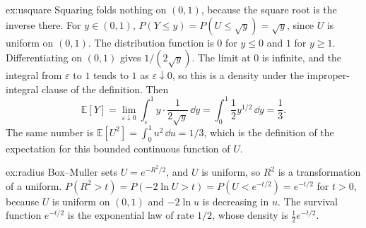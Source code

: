 \begin{solution}{ex:usquare}
\idea Squaring folds nothing on $(0,1)$, because the square root is the inverse there.
\writeup For $y\in(0,1)$, $P(Y\le y)=P(U\le\sqrt y)=\sqrt y$, since $U$ is uniform on $(0,1)$. The distribution function is $0$ for $y\le0$ and $1$ for $y\ge1$. Differentiating on $(0,1)$ gives $1/(2\sqrt y)$. The limit at $0$ is infinite, and the integral from $\varepsilon$ to $1$ tends to $1$ as $\varepsilon\downarrow0$, so this is a density under the improper-integral clause of the definition. Then
\[
 \mathbb E[Y]=\lim_{\varepsilon\downarrow0}\int_\varepsilon^1 y\cdot\frac{1}{2\sqrt y}\,\dd y=\int_0^1\frac12 y^{1/2}\,\dd y=\frac13.
\]
The same number is $\mathbb E[U^2]=\int_0^1 u^2\,\dd u=1/3$, which is the definition of the expectation for this bounded continuous function of $U$.
\end{solution}

\begin{solution}{ex:radius}
\idea Box--Muller sets $U=e^{-R^2/2}$, and $U$ is uniform, so $R^2$ is a transformation of a uniform.
\writeup $P(R^2>t)=P(-2\ln U>t)=P(U<e^{-t/2})=e^{-t/2}$ for $t>0$, because $U$ is uniform on $(0,1)$ and $-2\ln u$ is decreasing in $u$. The survival function $e^{-t/2}$ is the exponential law of rate $1/2$, whose density is $\tfrac12 e^{-t/2}$.
\end{solution}


